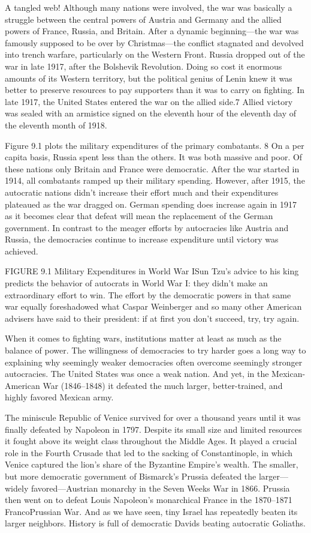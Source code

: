 \documentclass[10pt]{article}
\begin{document}
{\large A tangled web! Although many nations were involved, the war was
basically a struggle between the central powers of Austria and Germany and the
allied powers of France, Russia, and Britain. After a dynamic beginning---the war
was famously supposed to be over by Christmas---the conflict stagnated and
devolved into trench warfare, particularly on the Western Front. Russia dropped
out of the war in late 1917, after the Bolshevik Revolution. Doing so cost it
enormous amounts of its Western territory, but the political genius of Lenin knew
it was better to preserve resources to pay supporters than it was to carry on
fighting. In late 1917, the United States entered the war on the allied side.7
Allied victory was sealed with an armistice signed on the eleventh hour of the
eleventh day of the eleventh month of 1918.}

{\large Figure 9.1 plots the military expenditures of the primary combatants. 8
On a per capita basis, Russia spent less than the others. It was both massive and
poor. Of these nations only Britain and France were democratic. After the war
started in 1914, all combatants ramped up their military spending. However, after
1915, the autocratic nations didn't increase their effort much and their
expenditures plateaued as the war dragged on. German spending does increase again
in 1917 as it becomes clear that defeat will mean the replacement of the German
government. In contrast to the meager efforts by autocracies like Austria and
Russia, the democracies continue to increase expenditure until victory was
achieved.}

{\large FIGURE 9.1 Military Expenditures in World War ISun Tzu's advice to his
king predicts the behavior of autocrats in World War I: they didn't make an
extraordinary effort to win. The effort by the democratic powers in that same war
equally foreshadowed what Caspar Weinberger and so many other American advisers
have said to their president: if at first you don't succeed, try, try again.}

{\large When it comes to fighting wars, institutions matter at least as much as
the balance of power. The willingness of democracies to try harder goes a long
way to explaining why seemingly weaker democracies often overcome seemingly
stronger autocracies. The United States was once a weak nation. And yet, in the
Mexican-American War (1846--1848) it defeated the much larger, better-trained,
and highly favored Mexican army.}

{\large The miniscule Republic of Venice survived for over a thousand years
until it was finally defeated by Napoleon in 1797. Despite its small size and
limited resources it fought above its weight class throughout the Middle Ages. It
played a crucial role in the Fourth Crusade that led to the sacking of
Constantinople, in which Venice captured the lion's share of the Byzantine
Empire's wealth. The smaller, but more democratic government of Bismarck's
Prussia defeated the larger---widely favored---Austrian monarchy in the Seven
Weeks War in 1866. Prussia then went on to defeat Louis Napoleon's monarchical
France in the 1870--1871 FrancoPrussian War. And as we have seen, tiny Israel has
repeatedly beaten its larger neighbors. History is full of democratic Davids
beating autocratic Goliaths.}
\end{document}
